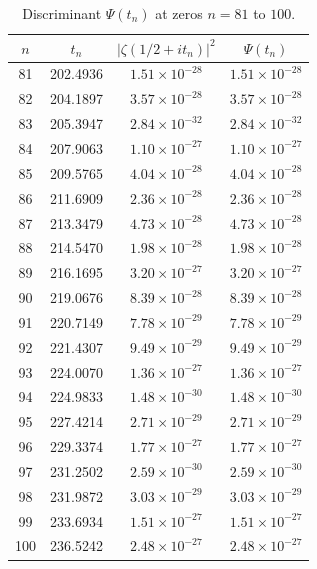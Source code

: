 \documentclass[12pt,a4paper]{article}
\begin{document}
\begin{table}[H]
\centering
\caption{Discriminant \(\Psi(t_n)\) at zeros \(n=81\) to \(100\).}
\label{tab:zeros80_100}
\begin{tabular}{cccc}
\toprule
\(n\) & \(t_n\) & \(|\zeta(1/2+it_n)|^2\) & \(\Psi(t_n)\) \\
\midrule
81 & 202.4936 & \(1.51\times10^{-28}\) & \(1.51\times10^{-28}\) \\
82 & 204.1897 & \(3.57\times10^{-28}\) & \(3.57\times10^{-28}\) \\
83 & 205.3947 & \(2.84\times10^{-32}\) & \(2.84\times10^{-32}\) \\
84 & 207.9063 & \(1.10\times10^{-27}\) & \(1.10\times10^{-27}\) \\
85 & 209.5765 & \(4.04\times10^{-28}\) & \(4.04\times10^{-28}\) \\
86 & 211.6909 & \(2.36\times10^{-28}\) & \(2.36\times10^{-28}\) \\
87 & 213.3479 & \(4.73\times10^{-28}\) & \(4.73\times10^{-28}\) \\
88 & 214.5470 & \(1.98\times10^{-28}\) & \(1.98\times10^{-28}\) \\
89 & 216.1695 & \(3.20\times10^{-27}\) & \(3.20\times10^{-27}\) \\
90 & 219.0676 & \(8.39\times10^{-28}\) & \(8.39\times10^{-28}\) \\
91 & 220.7149 & \(7.78\times10^{-29}\) & \(7.78\times10^{-29}\) \\
92 & 221.4307 & \(9.49\times10^{-29}\) & \(9.49\times10^{-29}\) \\
93 & 224.0070 & \(1.36\times10^{-27}\) & \(1.36\times10^{-27}\) \\
94 & 224.9833 & \(1.48\times10^{-30}\) & \(1.48\times10^{-30}\) \\
95 & 227.4214 & \(2.71\times10^{-29}\) & \(2.71\times10^{-29}\) \\
96 & 229.3374 & \(1.77\times10^{-27}\) & \(1.77\times10^{-27}\) \\
97 & 231.2502 & \(2.59\times10^{-30}\) & \(2.59\times10^{-30}\) \\
98 & 231.9872 & \(3.03\times10^{-29}\) & \(3.03\times10^{-29}\) \\
99 & 233.6934 & \(1.51\times10^{-27}\) & \(1.51\times10^{-27}\) \\
100 & 236.5242 & \(2.48\times10^{-27}\) & \(2.48\times10^{-27}\) \\
\bottomrule
\end{tabular}
\end{table}
\end{document}
